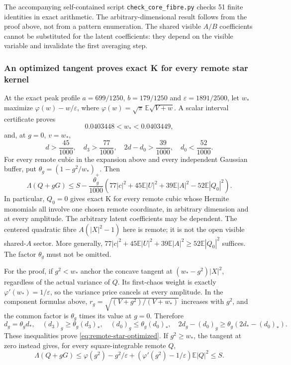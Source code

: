 The accompanying self-contained script \texttt{check\_core\_fibre.py} checks
51 finite identities in exact arithmetic. The arbitrary-dimensional result
follows from the proof above, not from a pattern enumeration. The shared
visible $A/B$ coefficients cannot be substituted for the latent coefficients:
they depend on the visible variable and invalidate the first averaging step.

\subsubsection{An optimized tangent proves exact K for every remote star kernel}

At the exact peak profile $a=699/1250$, $b=179/1250$ and
$\varepsilon=1891/2500$, let $w_*$ maximize
$\varphi(w)-w/\varepsilon$, where
$\varphi(w)=\sqrt\pi\,\mathbb E\sqrt{V+w}$.
A scalar interval certificate proves
\[
 0.0403448<w_*<0.0403449,
\]
and, at $g=0$, $v=w_*$,
\[
 d>\frac{45}{1000},\quad d_3>\frac{77}{1000},\quad
 2d-d_0>\frac{39}{1000},\quad d_0<\frac{52}{1000}.
\]
For every remote cubic in the expansion above and every independent Gaussian
buffer, put $\theta_g=(1-g^2/w_*)_+$. Then
\begin{equation}\label{eq:remote-star-optimized}
 \boxed{\Lambda(Q+gG)\le S-\frac{\theta_g}{1000}
  \left(77|c|^2+45\mathbb E|U|^2+39\mathbb E|A|^2
                            -52\mathbb E|Q_0|^2\right).}
\end{equation}
In particular, $Q_0=0$ gives exact K for every remote cubic whose Hermite
monomials all involve one chosen remote coordinate, in arbitrary dimension
and at every amplitude. The arbitrary latent coefficients may be dependent.
The centered quadratic fibre $A(|X|^2-1)$ here is remote; it is not the open
visible shared-$A$ sector. More generally,
$77|c|^2+45\mathbb E|U|^2+39\mathbb E|A|^2\ge52\mathbb E|Q_0|^2$
suffices. The factor $\theta_g$ must not be omitted.

For the proof, if $g^2<w_*$ anchor the concave tangent at
$(w_*-g^2)|X|^2$, regardless of the actual variance of $Q$.
Its first-chaos weight is exactly $\varphi'(w_*)=1/\varepsilon$, so the
variance price cancels at every amplitude. In the component formulas above,
$r_g=\sqrt{(V+g^2)/(V+w_*)}$ increases with $g^2$, and the common factor is
$\theta_g$ times its value at $g=0$. Therefore
\[
 d_g=\theta_gd_*,\quad (d_3)_g\ge\theta_g(d_3)_*,\quad
 (d_0)_g\le\theta_g(d_0)_*,\quad
 2d_g-(d_0)_g\ge\theta_g(2d_*-(d_0)_*).
\]
These inequalities prove \eqref{eq:remote-star-optimized}. If $g^2\ge w_*$,
the tangent at zero instead gives, for every square-integrable remote $Q$,
\[
 \Lambda(Q+gG)\le\varphi(g^2)-g^2/\varepsilon
 +(\varphi'(g^2)-1/\varepsilon)\mathbb E|Q|^2\le S.
\]

